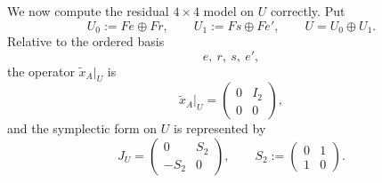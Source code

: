 \documentclass[
  11pt,
]{article}
\begin{document}
We now compute the residual \(4\times 4\) model on \(U\) correctly. Put
\[
U_0:=Fe\oplus Fr,
\qquad
U_1:=Fs\oplus Fe',
\qquad
U=U_0\oplus U_1.
\] Relative to the ordered basis \[
e,\ r,\ s,\ e',
\] the operator \(\widetilde x_A|_U\) is \[
\widetilde x_A|_U=
\begin{pmatrix}
0&I_2\\
0&0
\end{pmatrix},
\] and the symplectic form on \(U\) is represented by \[
J_U=
\begin{pmatrix}
0&S_2\\
-S_2&0
\end{pmatrix},
\qquad
S_2:=
\begin{pmatrix}
0&1\\
1&0
\end{pmatrix}.
\]
\end{document}
